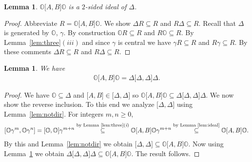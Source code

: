 \documentclass[10pt,a4paper]{amsart}
\numberwithin{equation}{section}
\newtheorem{Lemma}[Theorem]{Lemma}
\begin{document}
\begin{Lemma}
\label{lem:ideal}
$\mathbb O \lbrack A,B\rbrack \mathbb O$ is a $2$-sided ideal of
$\Delta $.
\end{Lemma}

\begin{proof}
Abbreviate $R =
\mathbb O \lbrack A,B\rbrack \mathbb O$.
We show $\Delta R\subseteq R$ and
$R\Delta \subseteq R$.
Recall that $\Delta $ is generated by
$\mathbb O$, $\gamma$.
By construction
 $\mathbb O R\subseteq R$ and
$R \mathbb  O\subseteq R$.
By Lemma~\ref{lem:three}$(iii)$ and
since $\gamma$ is central we have
 $\gamma R\subseteq R$ and
$R \gamma \subseteq R$.
By these comments
$\Delta R\subseteq R$ and
$R\Delta \subseteq R$.
\end{proof}

\begin{Lemma}
\label{lem:comu}
We have
\begin{gather*}
\mathbb O \lbrack A,B \rbrack \mathbb O=
\Delta\lbrack  \Delta,\Delta\rbrack \Delta .
\end{gather*}
\end{Lemma}

\begin{proof}
We  have
$\mathbb O \subseteq \Delta $
and
$\lbrack A,B\rbrack \in \lbrack \Delta ,\Delta \rbrack$
so
$\mathbb O \lbrack A,B \rbrack \mathbb  O\subseteq
\Delta\lbrack  \Delta,\Delta\rbrack \Delta $.
We now show the reverse inclusion.
To this end we analyze
$\lbrack \Delta ,\Delta \rbrack$
using
Lemma~\ref{lem:notdir}.
For integers $m,n\geq 0$,
\begin{gather*}
\lbrack \mathbb  O \gamma^m,\mathbb O \gamma^n\rbrack
 =
\lbrack \mathbb  O ,\mathbb  O \rbrack \gamma^{m+n}
\overset{\text{by Lemma \ref{lem:three}({\it i})}}{\subseteq}
\mathbb  O \lbrack A,B\rbrack \mathbb O \gamma^{m+n}
 \overset{\text{by Lemma \ref{lem:ideal}}}{\subseteq}
\mathbb  O \lbrack A,B\rbrack \mathbb O.
\end{gather*}
By
this and Lemma~\ref{lem:notdir} we
obtain
$\lbrack \Delta ,\Delta \rbrack \subseteq
\mathbb  O \lbrack A,B\rbrack \mathbb O$.
Now using
Lemma~\ref{lem:ideal} we obtain
$\Delta \lbrack \Delta ,\Delta \rbrack \Delta  \subseteq
\mathbb  O \lbrack A,B\rbrack \mathbb  O$.
The result follows.
\end{proof}
\end{document}
